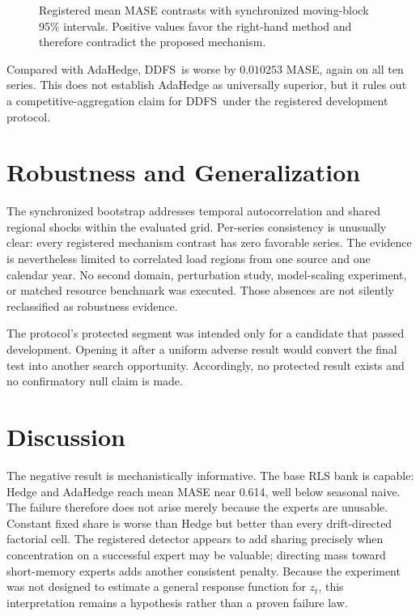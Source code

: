 \documentclass[10pt]{article}
\newcommand{\ddfs}{\textsc{DDFS}}
\begin{document}
\begin{figure}[t]
\centering

\caption{Registered mean MASE contrasts with synchronized moving-block 95\%
intervals. Positive values favor the right-hand method and therefore contradict the
proposed mechanism.}
\label{fig:contrasts}
\end{figure}

Compared with AdaHedge, \ddfs\ is worse by $0.010253$ MASE, again on all ten series.
This does not establish AdaHedge as universally superior, but it rules out a
competitive-aggregation claim for \ddfs\ under the registered development protocol.

\section{Robustness and Generalization}

The synchronized bootstrap addresses temporal autocorrelation and shared regional
shocks within the evaluated grid. Per-series consistency is unusually clear: every
registered mechanism contrast has zero favorable series. The evidence is nevertheless
limited to correlated load regions from one source and one calendar year. No second
domain, perturbation study, model-scaling experiment, or matched resource benchmark
was executed. Those absences are not silently reclassified as robustness evidence.

The protocol's protected segment was intended only for a candidate that passed
development. Opening it after a uniform adverse result would convert the final test
into another search opportunity. Accordingly, no protected result exists and no
confirmatory null claim is made.

\section{Discussion}

The negative result is mechanistically informative. The base RLS bank is capable:
Hedge and AdaHedge reach mean MASE near 0.614, well below seasonal naive. The failure
therefore does not arise merely because the experts are unusable. Constant fixed
share is worse than Hedge but better than every drift-directed factorial cell.
The registered detector appears to add sharing precisely when concentration on a
successful expert may be valuable; directing mass toward short-memory experts adds
another consistent penalty. Because the experiment was not designed to estimate a
general response function for $z_t$, this interpretation remains a hypothesis rather
than a proven failure law.
\end{document}
